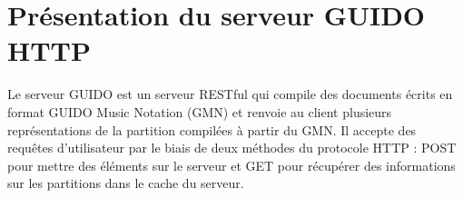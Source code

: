 \documentclass{article}
\begin{document}
\section{Présentation du serveur GUIDO HTTP}\label{section:overview}
Le serveur GUIDO est un serveur RESTful qui compile des documents écrits en format GUIDO Music Notation (GMN) et renvoie au client plusieurs représentations de la partition compilées à partir du GMN. Il accepte des requêtes d'utilisateur par le biais de deux méthodes du protocole HTTP : POST pour mettre des éléments sur le serveur et GET pour récupérer des informations sur les partitions dans le cache du serveur.
\end{document}
